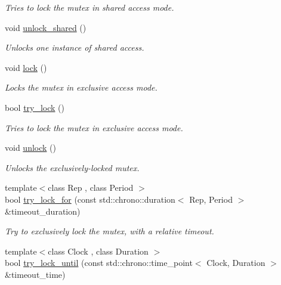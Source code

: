 \begin{DoxyCompactItemize}
\begin{DoxyCompactList}\small\item\em Tries to lock the mutex in shared access mode. \end{DoxyCompactList}\item 
void \hyperlink{classcpen333_1_1thread_1_1impl_1_1shared__mutex__shared_afba02f4b80ffa817aaa124fa4418465d}{unlock\+\_\+shared} ()
\begin{DoxyCompactList}\small\item\em Unlocks one instance of shared access. \end{DoxyCompactList}\item 
void \hyperlink{classcpen333_1_1thread_1_1impl_1_1shared__mutex__shared_ab38a0ee8010e85192efb9544aa460310}{lock} ()
\begin{DoxyCompactList}\small\item\em Locks the mutex in exclusive access mode. \end{DoxyCompactList}\item 
bool \hyperlink{classcpen333_1_1thread_1_1impl_1_1shared__mutex__shared_af7503e29c3774dad7db5c7bfffa4d6dc}{try\+\_\+lock} ()
\begin{DoxyCompactList}\small\item\em Tries to lock the mutex in exclusive access mode. \end{DoxyCompactList}\item 
void \hyperlink{classcpen333_1_1thread_1_1impl_1_1shared__mutex__shared_aa7e6c6ac6bbd3b72ada12d9f178c0cdd}{unlock} ()
\begin{DoxyCompactList}\small\item\em Unlocks the exclusively-\/locked mutex. \end{DoxyCompactList}\item 
{\footnotesize template$<$class Rep , class Period $>$ }\\bool \hyperlink{classcpen333_1_1thread_1_1impl_1_1shared__mutex__shared_a354b81f50045cbb68a8bb295222e4b5b}{try\+\_\+lock\+\_\+for} (const std\+::chrono\+::duration$<$ Rep, Period $>$ \&timeout\+\_\+duration)
\begin{DoxyCompactList}\small\item\em Try to exclusively lock the mutex, with a relative timeout. \end{DoxyCompactList}\item 
{\footnotesize template$<$class Clock , class Duration $>$ }\\bool \hyperlink{classcpen333_1_1thread_1_1impl_1_1shared__mutex__shared_a58baad110b6dfb6bc036a46f846f9f00}{try\+\_\+lock\+\_\+until} (const std\+::chrono\+::time\+\_\+point$<$ Clock, Duration $>$ \&timeout\+\_\+time)

\end{DoxyCompactItemize}
